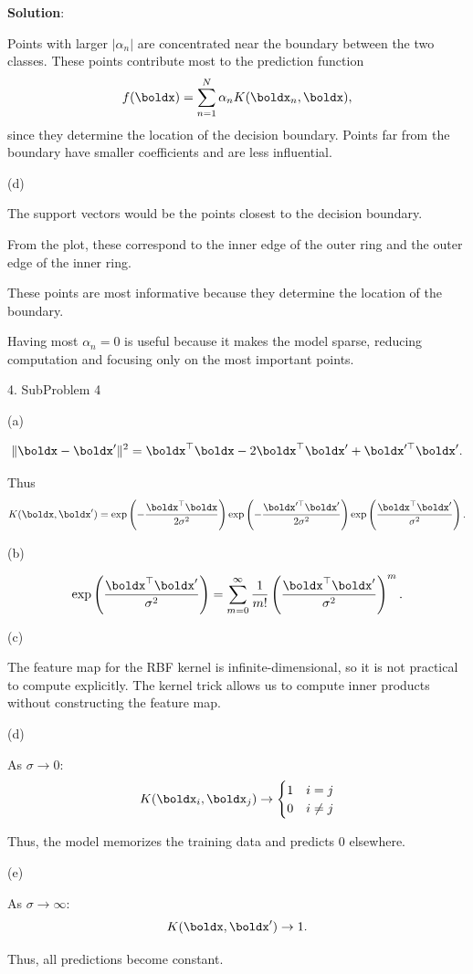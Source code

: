 \documentclass[submit]{harvardml}
\newenvironment{solution}{
    \vspace{2mm}
    \color{blue}\noindent\textbf{Solution}:
}{}
\begin{document}
\begin{solution}
Points with larger $|\alpha_n|$ are concentrated near the boundary between the two classes. These points contribute most to the prediction function
\[
f(\boldx) = \sum_{n=1}^N \alpha_n K(\boldx_n, \boldx),
\]
since they determine the location of the decision boundary. Points far from the boundary have smaller coefficients and are less influential.

(d)

The support vectors would be the points closest to the decision boundary.

From the plot, these correspond to the inner edge of the outer ring and the outer edge of the inner ring.

These points are most informative because they determine the location of the boundary.

Having most $\alpha_n = 0$ is useful because it makes the model sparse, reducing computation and focusing only on the most important points.

\item 4. SubProblem 4

(a)

\[
\|\boldx - \boldx'\|^2 = \boldx^\top \boldx - 2 \boldx^\top \boldx' + \boldx'^\top \boldx'.
\]

Thus
\[
K(\boldx,\boldx')
=
\exp\left(-\frac{\boldx^\top \boldx}{2\sigma^2}\right)
\exp\left(-\frac{\boldx'^\top \boldx'}{2\sigma^2}\right)
\exp\left(\frac{\boldx^\top \boldx'}{\sigma^2}\right).
\]

(b)

\[
\exp\left(\frac{\boldx^\top \boldx'}{\sigma^2}\right)
=
\sum_{m=0}^{\infty}
\frac{1}{m!}
\left(\frac{\boldx^\top \boldx'}{\sigma^2}\right)^m.
\]

(c)

The feature map for the RBF kernel is infinite-dimensional, so it is not practical to compute explicitly. The kernel trick allows us to compute inner products without constructing the feature map.

(d)

As $\sigma \to 0$:
\[
K(\boldx_i,\boldx_j) \to
\begin{cases}
1 & i=j \\
0 & i \ne j
\end{cases}
\]

Thus, the model memorizes the training data and predicts $0$ elsewhere.

(e)

As $\sigma \to \infty$:
\[
K(\boldx,\boldx') \to 1.
\]

Thus, all predictions become constant.

\end{solution}
\newpage
\end{document}
